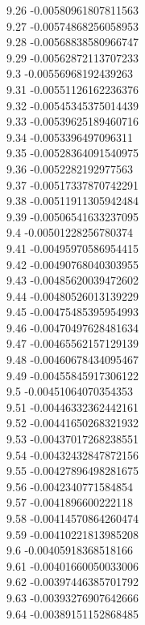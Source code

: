 {9.26	-0.00580961807811563\\
9.27	-0.00574868256058953\\
9.28	-0.00568838580966747\\
9.29	-0.00562872113707233\\
9.3	-0.00556968192439263\\
9.31	-0.00551126162236376\\
9.32	-0.00545345375014439\\
9.33	-0.00539625189460716\\
9.34	-0.0053396497096311\\
9.35	-0.00528364091540975\\
9.36	-0.0052282192977563\\
9.37	-0.00517337870742291\\
9.38	-0.00511911305942484\\
9.39	-0.00506541633237095\\
9.4	-0.00501228256780374\\
9.41	-0.00495970586954415\\
9.42	-0.00490768040303955\\
9.43	-0.00485620039472602\\
9.44	-0.00480526013139229\\
9.45	-0.00475485395954993\\
9.46	-0.00470497628481634\\
9.47	-0.00465562157129139\\
9.48	-0.00460678434095467\\
9.49	-0.00455845917306122\\
9.5	-0.00451064070354353\\
9.51	-0.00446332362442161\\
9.52	-0.00441650268321932\\
9.53	-0.00437017268238551\\
9.54	-0.00432432847872156\\
9.55	-0.00427896498281675\\
9.56	-0.0042340771584854\\
9.57	-0.0041896600222118\\
9.58	-0.00414570864260474\\
9.59	-0.00410221813985208\\
9.6	-0.00405918368518166\\
9.61	-0.00401660050033006\\
9.62	-0.00397446385701792\\
9.63	-0.00393276907642666\\
9.64	-0.00389151152868485\\
}
